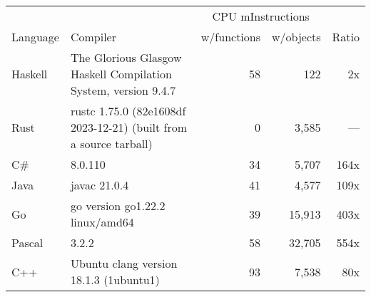 \documentclass{article}
\begin{document}
      \begin{tabularx}{\linewidth}{lXrrr}
      \toprule
        & & \multicolumn{2}{c}{CPU mInstructions} & \\
        Language & Compiler & w/functions & w/objects & Ratio \\
      \midrule
    Haskell & The Glorious Glasgow Haskell Compilation System, version 9.4.7 & 58 & 122 & 2x \\
Rust & rustc 1.75.0 (82e1608df 2023-12-21) (built from a source tarball) & 0 & 3,585 & --- \\
C\# & 8.0.110 & 34 & 5,707 & 164x \\
Java & javac 21.0.4 & 41 & 4,577 & 109x \\
Go & go version go1.22.2 linux/amd64 & 39 & 15,913 & 403x \\
Pascal & 3.2.2 & 58 & 32,705 & 554x \\
C++ & Ubuntu clang version 18.1.3 (1ubuntu1) & 93 & 7,538 & 80x \\

      \bottomrule
      \end{tabularx}
      
\end{document}
